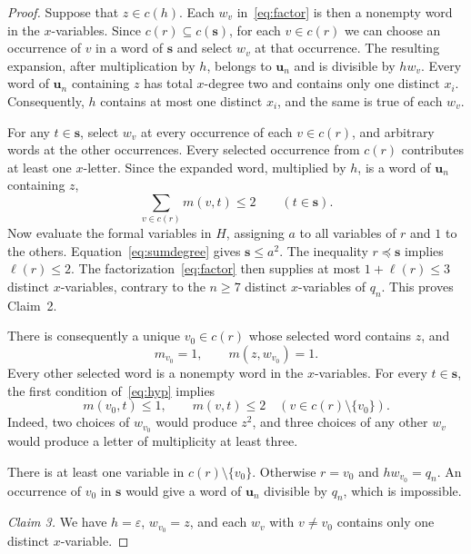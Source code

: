 \documentclass[11pt,reqno]{amsart}
\theoremstyle{remark}
\newcommand{\eps}{\varepsilon}
\newcommand{\bu}{\mathbf u}
\newcommand{\bs}{\mathbf s}
\numberwithin{equation}{section}
\begin{document}
\begin{proof}
Suppose that $z\in c(h)$. Each $w_v$ in~\eqref{eq:factor} is then a
nonempty word in the $x$-variables. Since $c(r)\subseteq c(\bs)$, for
each $v\in c(r)$ we can choose an occurrence of $v$ in a word of $\bs$
and select $w_v$ at that occurrence. The resulting expansion, after
multiplication by $h$, belongs to $\bu_n$ and is divisible by $hw_v$.
Every word of $\bu_n$ containing $z$ has total $x$-degree two and
contains only one distinct $x_i$. Consequently, $h$ contains at most one
distinct $x_i$, and the same is true of each $w_v$.

For any $t\in\bs$, select $w_v$ at every occurrence of each
$v\in c(r)$, and arbitrary words at the other occurrences. Every selected
occurrence from $c(r)$ contributes at least one $x$-letter. Since the
expanded word, multiplied by $h$, is a word of $\bu_n$ containing $z$,
\begin{equation}\label{eq:sumdegree}
\sum_{v\in c(r)}m(v,t)\leq2\qquad(t\in\bs).
\end{equation}
Now evaluate the formal variables in $H$, assigning $a$ to all variables
of $r$ and $1$ to the others. Equation~\eqref{eq:sumdegree} gives
$\bs\leq a^2$. The inequality $r\preceq\bs$ implies $\ell(r)\leq2$.
The factorization~\eqref{eq:factor} then supplies at most
$1+\ell(r)\leq3$ distinct $x$-variables, contrary to the $n\geq7$
distinct $x$-variables of $q_n$. This proves Claim~2.

There is consequently a unique $v_0\in c(r)$ whose selected word
contains $z$, and
\begin{equation}\label{eq:v0}
m_{v_0}=1,\qquad m(z,w_{v_0})=1.
\end{equation}
Every other selected word is a nonempty word in the $x$-variables.
For every $t\in\bs$, the first condition of~\eqref{eq:hyp} implies
\begin{equation}\label{eq:sdegree}
m(v_0,t)\leq1,\qquad m(v,t)\leq2
\quad(v\in c(r)\setminus\{v_0\}).
\end{equation}
Indeed, two choices of $w_{v_0}$ would produce $z^2$, and three choices
of any other $w_v$ would produce a letter of multiplicity at least three.

There is at least one variable in $c(r)\setminus\{v_0\}$. Otherwise
$r=v_0$ and $hw_{v_0}=q_n$. An occurrence of $v_0$ in $\bs$ would give
a word of $\bu_n$ divisible by $q_n$, which is impossible.

\emph{Claim 3.} We have $h=\eps$, $w_{v_0}=z$, and each
$w_v$ with $v\ne v_0$ contains only one distinct $x$-variable.


\end{proof}
\end{document}
